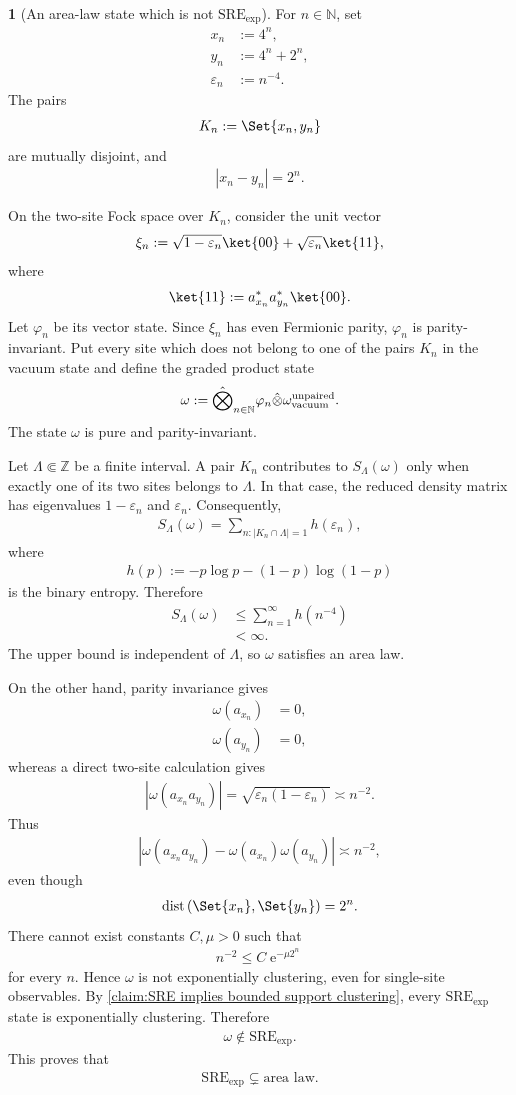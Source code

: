 \documentclass[a4paper,10pt]{article}
\numberwithin{equation}{section}
\theoremstyle{plain}
\theoremstyle{plain}
\theoremstyle{plain}
\theoremstyle{plain}
\theoremstyle{plain}
\theoremstyle{remark}
\theoremstyle{definition}
\newtheorem{example}[example]{\protect\examplename}
\providecommand{\examplename}{Example}
\newcommand{\ee}{\operatorname{e}}
\newcommand{\ZZ}{\mathbb{Z}}
\newcommand{\NN}{\mathbb{N}}
\newcommand{\dist}{\mathrm{dist}}
\newcommand{\eq}[1]{\begin{align*}#1\end{align*}}
\newcommand{\eql}[1]{\begin{align}#1\end{align}}
\newcommand{\br}[1]{\left(#1\right)}
\begin{document}
\begin{example}[An area-law state which is not
\(\mathrm{SRE}_{\exp}\)]
\label{ex:area law not SRE}
For $n\in\NN$, set
\eq{
    x_n
    &:=
    4^n,\\
    y_n
    &:=
    4^n+2^n,\\
    \varepsilon_n
    &:=
    n^{-4}.
}
The pairs
\eq{
    K_n
    :=
    \Set{x_n,y_n}
}
are mutually disjoint, and
\eq{
    |x_n-y_n|
    =
    2^n.
}

On the two-site Fock space over $K_n$, consider the unit vector
\eq{
    \xi_n
    :=
    \sqrt{1-\varepsilon_n}
    \ket{00}
    +
    \sqrt{\varepsilon_n}
    \ket{11},
}
where
\eq{
    \ket{11}
    :=
    a_{x_n}^*a_{y_n}^*\ket{00}.
}
Let $\varphi_n$ be its vector state. Since $\xi_n$ has even Fermionic
parity, $\varphi_n$ is parity-invariant. Put every site which does not
belong to one of the pairs $K_n$ in the vacuum state and define the
graded product state
\eql{\label{eq:sparse pair state}
    \omega
    :=
    \hat{\bigotimes}_{n\in\NN}
    \varphi_n
    \hat{\otimes}
    \omega_{\rm vacuum}^{\rm unpaired}.
}
The state $\omega$ is pure and parity-invariant.

Let $\Lambda\Subset\ZZ$ be a finite interval. A pair $K_n$ contributes
to $S_\Lambda(\omega)$ only when exactly one of its two sites belongs to
$\Lambda$. In that case, the reduced density matrix has eigenvalues
$1-\varepsilon_n$ and $\varepsilon_n$. Consequently,
\eq{
    S_\Lambda(\omega)
    =
    \sum_{
        n:
        |K_n\cap\Lambda|=1
    }
    h(\varepsilon_n),
}
where
\eq{
    h(p)
    :=
    -p\log p
    -
    (1-p)\log(1-p)
}
is the binary entropy. Therefore
\eq{
    S_\Lambda(\omega)
    &\leq
    \sum_{n=1}^{\infty}
    h(n^{-4})\\
    &<
    \infty.
}
The upper bound is independent of $\Lambda$, so $\omega$ satisfies an
area law.

On the other hand, parity invariance gives
\eq{
    \omega(a_{x_n})
    &=
    0,\\
    \omega(a_{y_n})
    &=
    0,
}
whereas a direct two-site calculation gives
\eq{
    \left|
        \omega(a_{x_n}a_{y_n})
    \right|
    =
    \sqrt{
        \varepsilon_n
        \br{
            1-\varepsilon_n
        }
    }
    \asymp
    n^{-2}.
}
Thus
\eq{
    \left|
        \omega(a_{x_n}a_{y_n})
        -
        \omega(a_{x_n})
        \omega(a_{y_n})
    \right|
    \asymp
    n^{-2},
}
even though
\eq{
    \dist
    \br{
        \Set{x_n},
        \Set{y_n}
    }
    =
    2^n.
}
There cannot exist constants $C,\mu>0$ such that
\eq{
    n^{-2}
    \leq
    C\ee^{-\mu2^n}
}
for every $n$. Hence $\omega$ is not exponentially clustering, even for
single-site observables. By
\cref{claim:SRE implies bounded support clustering}, every
$\mathrm{SRE}_{\exp}$ state is exponentially clustering. Therefore
\eq{
    \omega
    \notin
    \mathrm{SRE}_{\exp}.
}
This proves that
\eq{
    \mathrm{SRE}_{\exp}
    \subsetneq
    \text{area law}.
}
\end{example}
\end{document}
